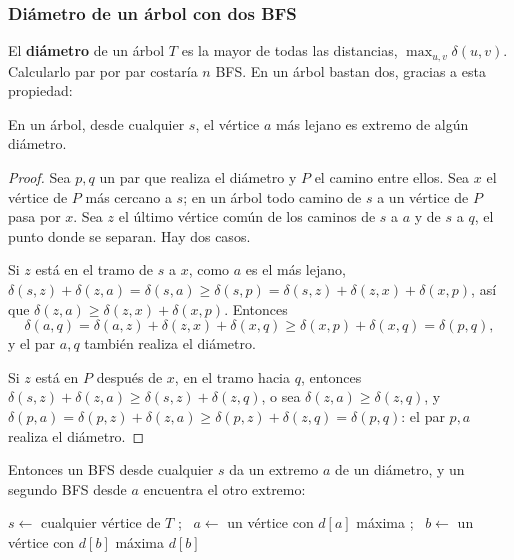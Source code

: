 \documentclass[11pt,letterpaper]{article}
\begin{document}
\subsubsection*{Diámetro de un árbol con dos BFS}

El \textbf{diámetro} de un árbol $T$ es la mayor de todas las
distancias, $\max_{u, v} \delta(u, v)$. Calcularlo par por par
costaría $n$ BFS. En un árbol bastan dos, gracias a esta propiedad:

\begin{proposicion}
  \label{prop:busq-diametro}
  En un árbol, desde cualquier $s$, el vértice $a$ más lejano es
  extremo de algún diámetro.
\end{proposicion}

\begin{proof}
  Sea $p, q$ un par que realiza el diámetro y $P$ el camino entre
  ellos. Sea $x$ el vértice de $P$ más cercano a $s$; en un árbol todo
  camino de $s$ a un vértice de $P$ pasa por $x$. Sea $z$ el último
  vértice común de los caminos de $s$ a $a$ y de $s$ a $q$, el punto
  donde se separan. Hay dos casos.

  Si $z$ está en el tramo de $s$ a $x$, como $a$ es el más lejano,
  $\delta(s, z) + \delta(z, a) = \delta(s, a) \geq \delta(s, p) =
  \delta(s, z) + \delta(z, x) + \delta(x, p)$, así que
  $\delta(z, a) \geq \delta(z, x) + \delta(x, p)$. Entonces
  \[
    \delta(a, q) = \delta(a, z) + \delta(z, x) + \delta(x, q)
    \geq \delta(x, p) + \delta(x, q) = \delta(p, q) ,
  \]
  y el par $a, q$ también realiza el diámetro.

  Si $z$ está en $P$ después de $x$, en el tramo hacia $q$, entonces
  $\delta(s, z) + \delta(z, a) \geq \delta(s, z) + \delta(z, q)$, o
  sea $\delta(z, a) \geq \delta(z, q)$, y
  $\delta(p, a) = \delta(p, z) + \delta(z, a) \geq \delta(p, z) +
  \delta(z, q) = \delta(p, q)$: el par $p, a$ realiza el diámetro.
\end{proof}

Entonces un BFS desde cualquier $s$ da un extremo $a$ de un diámetro,
y un segundo BFS desde $a$ encuentra el otro extremo:

\begin{algorithm}[H]
\caption{\textsc{Diámetro}$(T)$ de un árbol con dos BFS}
\label{alg:busq-diametro}
\begin{algorithmic}[1]
  \State $s \gets$ cualquier vértice de $T$
  \State {}; \ $a \gets$ un vértice con $d[a]$ máxima
  \State {}; \ $b \gets$ un vértice con $d[b]$ máxima
  \State \Return $d[b]$
\EndProcedure
\end{algorithmic}
\end{algorithm}
\end{document}
